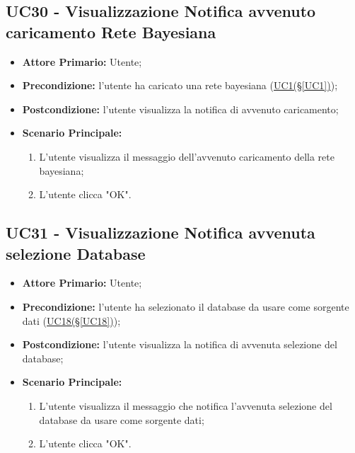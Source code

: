 \pagebreak

\subsection{UC30 - Visualizzazione Notifica avvenuto caricamento Rete Bayesiana}\label{UC30}

\begin{itemize}
	\item \textbf{Attore Primario:} Utente;
	\item \textbf{Precondizione:} l'utente ha caricato una rete bayesiana (\hyperref[UC1]{UC1(§\ref*{UC1})});
	\item \textbf{Postcondizione:} l'utente visualizza la notifica di avvenuto caricamento;
	\item \textbf{Scenario Principale:}
	\begin{enumerate}
		\item L'utente visualizza il messaggio dell'avvenuto caricamento della rete bayesiana;
		\item L'utente clicca "OK".
	\end{enumerate}
\end{itemize}

\pagebreak

\subsection{UC31 - Visualizzazione Notifica avvenuta selezione Database}\label{UC31}

\begin{itemize}
	\item \textbf{Attore Primario:} Utente;
	\item \textbf{Precondizione:} l'utente ha selezionato il database da usare come sorgente dati (\hyperref[UC18]{UC18(§\ref*{UC18})});
	\item \textbf{Postcondizione:} l'utente visualizza la notifica di avvenuta selezione del database;
	\item \textbf{Scenario Principale:}
	\begin{enumerate}
		\item L'utente visualizza il messaggio che notifica l'avvenuta selezione del database da usare come sorgente dati;
		\item L'utente clicca "OK".
	\end{enumerate}
\end{itemize}

\pagebreak

